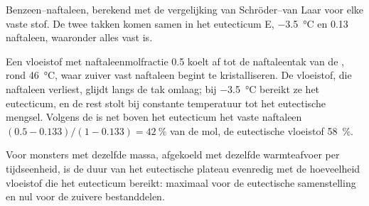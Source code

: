 \begin{omfigure}

{\small Benzeen--naftaleen, berekend met de vergelijking van Schröder--van Laar
voor elke vaste stof. De twee takken komen samen in het eutecticum E,
\qty{-3.5}{\degreeCelsius} en 0.13 naftaleen, waaronder alles vast is.}
\end{omfigure}

\begin{example}\label{ex:b2:solid-liquid-diagrams:naphthalene}
Een vloeistof met naftaleenmolfractie 0.5 koelt af tot de naftaleentak
van de , rond \qty{46}{\degreeCelsius}, waar zuiver vast naftaleen
begint te kristalliseren. De vloeistof, die naftaleen verliest, glijdt langs de
tak omlaag; bij \qty{-3.5}{\degreeCelsius} bereikt ze het eutecticum, en de rest
stolt bij constante temperatuur tot het eutectische mengsel. Volgens de  is
net boven het eutecticum het vaste naftaleen $(0.5 - 0.133)/(1 - 0.133) =
42~\%$ van de mol, de eutectische vloeistof 58~\%.
\end{example}

\begin{proposition}\label{prop:b2:solid-liquid-diagrams:plateau-length}
Voor monsters met dezelfde massa, afgekoeld met dezelfde warmteafvoer per tijdseenheid, is de
duur van het eutectische plateau evenredig met de hoeveelheid vloeistof die het
eutecticum bereikt: maximaal voor de eutectische samenstelling en nul voor de
zuivere bestanddelen.
\end{proposition}

